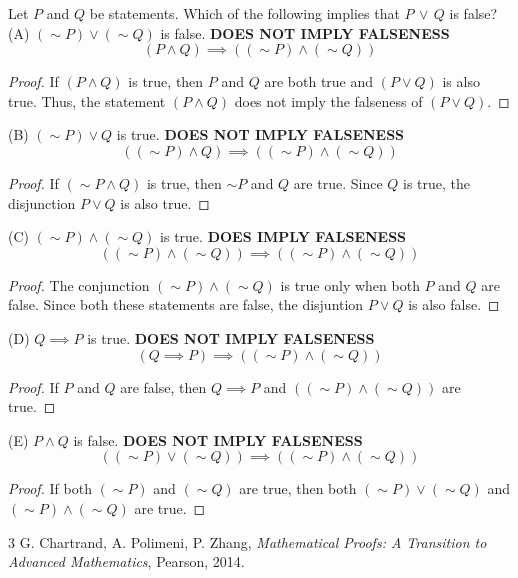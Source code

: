 \documentclass[12pt]{article}
\newenvironment{problem}[2][Problem]{\begin{trivlist}
		\item[\hskip \labelsep {\bfseries #1}\hskip \labelsep {\bfseries #2.}]}{\end{trivlist}}
\begin{document}
\begin{problem}{29}
	Let $P$ and $Q$ be statements. Which of the following implies that $P \, \vee \, Q$ is false?\\
	
	(A) $(\sim P) \vee (\sim Q)$ is false. \textbf{ DOES NOT IMPLY FALSENESS}
	\begin{equation}
		(P \wedge Q) \implies ((\sim P) \wedge (\sim Q))
	\end{equation}
\begin{proof}
	If $(P \wedge Q)$ is true, then $P$ and $Q$ are both true and $(P \vee Q)$ is also true. Thus, the statement $(P \wedge Q)$ does not imply the falseness of $(P \vee Q)$.
\end{proof}
	(B) $(\sim P) \vee Q$ is true. \textbf{ DOES NOT IMPLY FALSENESS}
	\begin{equation}
		((\sim P) \wedge Q) \implies ((\sim P) \wedge (\sim Q))
	\end{equation}
	\begin{proof}
		If $(\sim P \wedge Q)$ is true, then $\sim P$ and $Q$ are true. Since $Q$ is true, the disjunction $P \vee Q$ is also true.
	\end{proof}
	(C) $(\sim P) \wedge (\sim Q)$ is true. \textbf{ DOES IMPLY FALSENESS}
	\begin{equation}
		((\sim P) \wedge (\sim Q)) \implies ((\sim P) \wedge (\sim Q))
	\end{equation}
\begin{proof}
	The conjunction $(\sim P) \wedge (\sim Q)$ is true only when both $P$ and $Q$ are false. Since both these statements are false, the disjuntion $P \vee Q$ is also false.
\end{proof}
	(D) $Q \implies P$ is true. \textbf{ DOES NOT IMPLY FALSENESS}
	\begin{equation}
		(Q \implies P) \implies ((\sim P) \wedge (\sim Q))
	\end{equation}
\begin{proof}
	If $P$ and $Q$ are false, then $Q \implies P$ and $((\sim P) \wedge (\sim Q))$ are true.
\end{proof}
	(E) $P \wedge Q$ is false. \textbf{DOES NOT IMPLY FALSENESS}
	\begin{equation}
		((\sim P) \vee (\sim Q)) \implies ((\sim P) \wedge (\sim Q))
	\end{equation}
\begin{proof}
	If both $(\sim P)$ and $(\sim Q)$ are true, then both $(\sim P) \vee (\sim Q)$ and $(\sim P) \wedge (\sim Q)$ are true.
\end{proof}
\end{problem}
\begin{thebibliography}{3}
	G. Chartrand,  A. Polimeni, P. Zhang, 
	\textit{Mathematical Proofs: A Transition to Advanced Mathematics}, Pearson, 2014.
\end{thebibliography}
\end{document}
